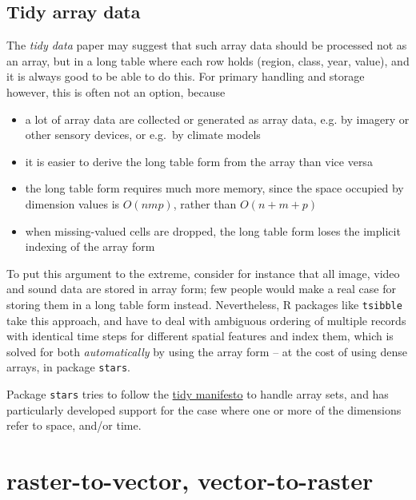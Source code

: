 \documentclass[]{book}
\providecommand{\tightlist}{%
  \setlength{\itemsep}{0pt}\setlength{\parskip}{0pt}}
\begin{document}
\hypertarget{tidy-array-data}{%
\subsection{Tidy array data}\label{tidy-array-data}}

The \emph{tidy data} paper \citep{tidy} may suggest that such array data
should be processed not as an array, but in a long table where
each row holds (region, class, year, value), and it is always good
to be able to do this. For primary handling and storage however,
this is often not an option, because

\begin{itemize}
\tightlist
\item
  a lot of array data are collected or generated as array data, e.g.
  by imagery or other sensory devices, or e.g.~by climate models
\item
  it is easier to derive the long table form from the array than
  vice versa
\item
  the long table form requires much more memory, since the space
  occupied by dimension values is \(O(nmp)\), rather than \(O(n+m+p)\)
\item
  when missing-valued cells are dropped, the long table form loses
  the implicit indexing of the array form
\end{itemize}

To put this argument to the extreme, consider for instance that
all image, video and sound data are stored in array form; few
people would make a real case for storing them in a long table
form instead. Nevertheless, R packages like \texttt{tsibble} take this
approach, and have to deal with ambiguous ordering of multiple records
with identical time steps for different spatial features and index
them, which is solved for both \emph{automatically} by using the array
form -- at the cost of using dense arrays, in package \texttt{stars}.

Package \texttt{stars} tries to follow the \href{https://cran.r-project.org/web/packages/tidyverse/vignettes/manifesto.html}{tidy
manifesto}
to handle array sets, and has particularly developed support for the
case where one or more of the dimensions refer to space, and/or time.

\hypertarget{raster-to-vector}{%
\section{raster-to-vector, vector-to-raster}\label{raster-to-vector}}
\end{document}

